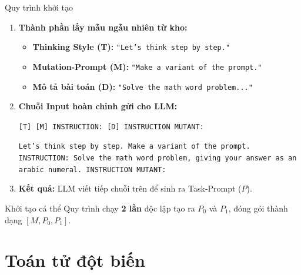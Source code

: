 \documentclass[english,main=vietnamese,xcolor=table]{beamer}
\begin{document}
\begin{frame}{Quy trình khởi tạo}

\small
\begin{enumerate}
    \item \textbf{Thành phần lấy mẫu ngẫu nhiên từ kho:}
    \begin{itemize}
        \small
        \item \textbf{\color{tcolor}Thinking Style (T):} \texttt{"Let's think step by step."}
        \item \textbf{\color{mcolor}Mutation-Prompt (M):} \texttt{"Make a variant of the prompt."}
        \item \textbf{\color{dcolor}Mô tả bài toán (D):} \texttt{"Solve the math word problem..."}
    \end{itemize}

    \vspace{0.4em}
    \item \textbf{Chuỗi Input hoàn chỉnh gửi cho LLM:}
    \begin{center}
        \footnotesize
        \texttt{{\color{tcolor}[T]} {\color{mcolor}[M]} INSTRUCTION: {\color{dcolor}[D]} INSTRUCTION MUTANT:}
    \end{center}
    \footnotesize
    \texttt{{\color{tcolor}Let's think step by step.} {\color{mcolor}Make a variant of the prompt.} INSTRUCTION: {\color{dcolor}Solve the math word problem, giving your answer as an arabic numeral.} INSTRUCTION MUTANT:}

    \vspace{0.6em}
    \small
    \item \textbf{Kết quả:} LLM viết tiếp chuỗi trên để sinh ra Task-Prompt ($P$). 
\end{enumerate}
\begin{block}{Khởi tạo cá thể}
    Quy trình chạy \textbf{2 lần} độc lập tạo ra $P_0$ và $P_1$, đóng gói thành dạng $[M, P_0, P_1]$.
\end{block}
\end{frame}
\section{Toán tử đột biến}
\end{document}

